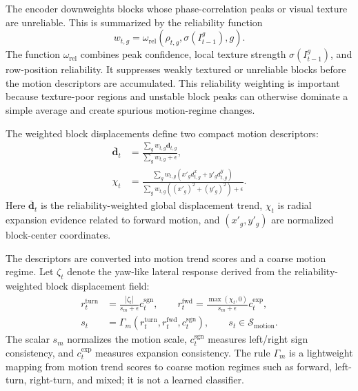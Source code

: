 The encoder downweights blocks whose phase-correlation peaks or visual texture are unreliable. This is summarized by the reliability function
\begin{equation}
w_{t,g}
=\omega_{\mathrm{rel}}
\left(
\rho_{t,g},
\sigma(I_{t-1}^{g}),
g
\right).
\label{eq:block_reliability}
\end{equation}
The function \(\omega_{\mathrm{rel}}\) combines peak confidence, local texture strength \(\sigma(I_{t-1}^{g})\), and row-position reliability. It suppresses weakly textured or unreliable blocks before the motion descriptors are accumulated. This reliability weighting is important because texture-poor regions and unstable block peaks can otherwise dominate a simple average and create spurious motion-regime changes.

The weighted block displacements define two compact motion descriptors:
\begin{equation}
\begin{aligned}
\bar{\mathbf{d}}_{t}
&=
\frac{\sum_g w_{t,g}\mathbf{d}_{t,g}}
{\sum_g w_{t,g}+\epsilon},\\
\chi_t
&=
\frac{\sum_g w_{t,g}
\left(x'_g d^{x}_{t,g}+y'_g d^{y}_{t,g}\right)}
{\sum_g w_{t,g}\left((x'_g)^2+(y'_g)^2\right)+\epsilon}.
\end{aligned}
\label{eq:motion_descriptors}
\end{equation}
Here \(\bar{\mathbf{d}}_t\) is the reliability-weighted global displacement trend, \(\chi_t\) is radial expansion evidence related to forward motion, and \((x'_g,y'_g)\) are normalized block-center coordinates.

The descriptors are converted into motion trend scores and a coarse motion regime. Let \(\zeta_t\) denote the yaw-like lateral response derived from the reliability-weighted block displacement field:
\begin{equation}
\begin{aligned}
r_t^{\mathrm{turn}}
&=\frac{|\zeta_t|}{s_m+\epsilon}c_t^{\mathrm{sgn}},
\qquad
r_t^{\mathrm{fwd}}
=\frac{\max(\chi_t,0)}{s_m+\epsilon}c_t^{\mathrm{exp}},\\
s_t
&=\Gamma_m(r_t^{\mathrm{turn}},
r_t^{\mathrm{fwd}},c_t^{\mathrm{sgn}}),
\qquad
s_t\in\mathcal{S}_{\mathrm{motion}}.
\end{aligned}
\label{eq:motion_regime_assignment}
\end{equation}
The scalar \(s_m\) normalizes the motion scale, \(c_t^{\mathrm{sgn}}\) measures left/right sign consistency, and \(c_t^{\mathrm{exp}}\) measures expansion consistency. The rule \(\Gamma_m\) is a lightweight mapping from motion trend scores to coarse motion regimes such as forward, left-turn, right-turn, and mixed; it is not a learned classifier.

